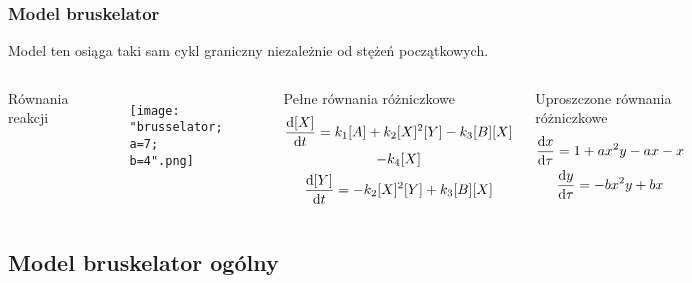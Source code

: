 \documentclass{beamer}
\begin{document}
\begin{frame}
\frametitle{Model bruskelator}
\small Model ten osiąga taki sam cykl graniczny niezależnie od stężeń początkowych. \normalsize
\begin{columns}
\begin{block}{Równania reakcji}
\begin{center}
	 \\
	 \\
	 \\
\end{center}
\end{block}
\begin{figure}
\texttt{[image: "brusselator; a=7; b=4".png]}
\end{figure}
\begin{block}{Pełne równania różniczkowe}
\small
\begin{gather*}
	\dv{[X]}{t} = k_{1}[A]+k_{2}[X]^{2}[Y]-k_{3}[B][X] \\
	-k_{4}[X] \\
	\dv{[Y]}{t} = -k_{2}[X]^{2}[Y]+k_{3}[B][X]
\end{gather*}
\normalsize
\end{block}
\begin{block}{Uproszczone równania różniczkowe}
\begin{gather*}
	\dv{x}{\tau} = 1+ax^{2}y-ax-x \\
	\dv{y}{\tau} = -bx^{2}y+bx
\end{gather*}
\end{block}
\end{columns}
\end{frame}

\subsection{Model bruskelator ogólny}
\end{document}
